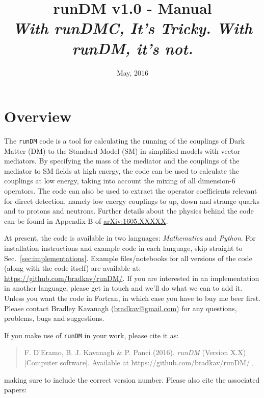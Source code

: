 \documentclass[notitlepage,12pt]{article}
\newcommand{\runDM}{\texttt{runDM}\xspace}
\newcommand{\ourpaper}{\href{http://arxiv.org/abs/1605.XXXXX}{arXiv:1605.XXXXX}\xspace}
\begin{document}
\title{runDM v1.0 - Manual \\ \vspace{0.5cm}\normalsize \textit{With runDMC, It's Tricky. With runDM, it's not.}}

\date{\vspace{-1cm} May, 2016}

\maketitle

\tableofcontents

\section{Overview}

The \runDM code is a tool for calculating the running of the couplings of Dark Matter (DM) to the Standard Model (SM) in simplified models with vector mediators. By specifying the mass of the mediator and the couplings of the mediator to SM fields at high energy, the code can be used to calculate the couplings at low energy, taking into account the mixing of all dimension-6 operators. The code can also be used to extract the operator coefficients relevant for direct detection, namely low energy couplings to up, down and strange quarks and to protons and neutrons. Further details about the physics behind the code can be found in Appendix B of \ourpaper.

At present, the code is available in two languages: \textit{Mathematica} and \textit{Python}. For installation instructions and example code in each language, skip straight to Sec.~\ref{sec:implementations}. Example files/notebooks for all versions of the code (along with the code itself) are available at: \href{https://github.com/bradkav/runDM/}{https://github.com/bradkav/runDM/}. If you are interested in an implementation in another language, please get in touch and we'll do what we can to add it. Unless you want the code in Fortran, in which case you have to buy me beer first. Please contact Bradley Kavanagh (\href{mailto:bradkav@gmail.com?subject=runDM v.10}{bradkav@gmail.com}) for any questions, problems, bugs and suggestions.

If you make use of \runDM in your work, please cite it as:

\begin{quote}
F. D'Eramo, B. J. Kavanagh \& P. Panci (2016). \textit{runDM} (Version X.X) [Computer software]. Available at https://github.com/bradkav/runDM/\,,
\end{quote}
making sure to include the correct version number. Please also cite the associated papers:
\end{document}
